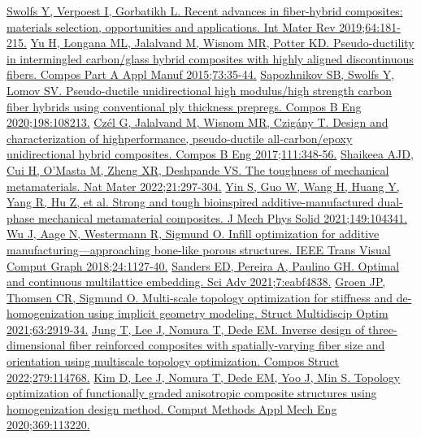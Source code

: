 \documentclass[a4paper,7pt,fleqn]{article}   %
\begin{document}
\begin{multicols}{2}
		\begin{thebibliography}{99} \small
			\href{https://doi.org/10.1080/09506608.2018.1467365}{Swolfs Y, Verpoest I, Gorbatikh L. Recent advances in fiber-hybrid composites: materials selection, opportunities and applications. Int Mater Rev 2019;64:181-215.}
			\href{https://doi.org/10.1016/j.compositesa.2015.02.014}{Yu H, Longana ML, Jalalvand M, Wisnom MR, Potter KD. Pseudo-ductility in intermingled carbon/glass hybrid composites with highly aligned discontinuous fibers. Compos Part A Appl Manuf 2015;73:35-44.}
			\href{https://doi.org/10.1016/j.compositesb.2020.108213}{Sapozhnikov SB, Swolfs Y, Lomov SV. Pseudo-ductile unidirectional high modulus/high strength carbon fiber hybrids using conventional ply thickness prepregs. Compos B Eng 2020;198:108213.}
			\href{https://doi.org/10.1016/j.compositesb.2016.11.049}{Czél G, Jalalvand M, Wisnom MR, Czigány T. Design and characterization of highperformance, pseudo-ductile all-carbon/epoxy unidirectional hybrid composites. Compos B Eng 2017;111:348-56.}
			\href{https://doi.org/10.1038/s41563-021-01182-1}{Shaikeea AJD, Cui H, O'Masta M, Zheng XR, Deshpande VS. The toughness of mechanical metamaterials. Nat Mater 2022;21:297-304.}
			\href{https://doi.org/10.1016/j.jmps.2021.104341}{Yin S, Guo W, Wang H, Huang Y, Yang R, Hu Z, et al. Strong and tough bioinspired additive-manufactured dual-phase mechanical metamaterial composites. J Mech Phys Solid 2021;149:104341.}
			\href{https://doi.org/10.1109/TVCG.2017.2655523}{Wu J, Aage N, Westermann R, Sigmund O. Infill optimization for additive manufacturing—approaching bone-like porous structures. IEEE Trans Visual Comput Graph 2018;24:1127-40.}
			\href{https://doi.org/10.1126/sciadv.abf4838}{Sanders ED, Pereira A, Paulino GH. Optimal and continuous multilattice embedding. Sci Adv 2021;7:eabf4838.}
			\href{https://doi.org/10.1007/s00158-021-02874-7}{Groen JP, Thomsen CR, Sigmund O. Multi-scale topology optimization for stiffness and de-homogenization using implicit geometry modeling. Struct Multidiscip Optim 2021;63:2919-34.}
			\href{https://doi.org/10.1016/j.compstruct.2021.114768}{Jung T, Lee J, Nomura T, Dede EM. Inverse design of three-dimensional fiber reinforced composites with spatially-varying fiber size and orientation using multiscale topology optimization. Compos Struct 2022;279:114768.}
			\href{https://doi.org/10.1016/j.cma.2020.113220}{Kim D, Lee J, Nomura T, Dede EM, Yoo J, Min S. Topology optimization of functionally graded anisotropic composite structures using homogenization design method. Comput Methods Appl Mech Eng 2020;369:113220.}

\end{thebibliography}
\end{multicols}
\end{document}
